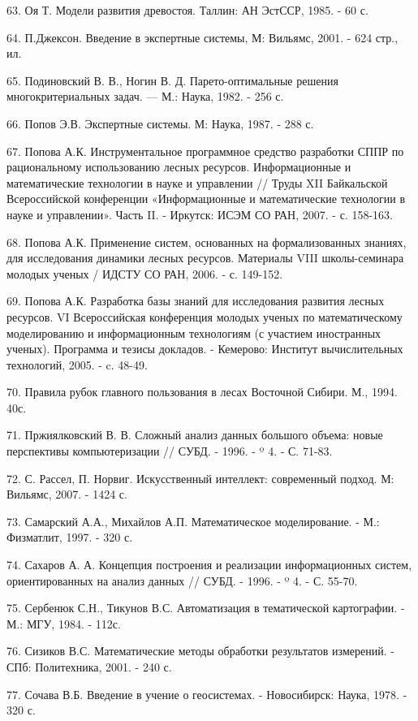 \documentclass{article}
\begin{document}
63. Оя Т. Модели развития древостоя. Таллин: АН 
ЭстССР, 1985. - 60 с.

64. П.Джексон. Введение в экспертные системы, 
М: Вильямс, 2001. - 624 стр., ил.

65. Подиновский В. В., Ногин В. Д. Парето-оптимальные 
решения многокритериальных задач. --- М.: Наука, 
1982. - 256 с.

66. Попов Э.В. Экспертные системы. М: Наука, 1987. 
- 288 с.

67. Попова А.К. Инструментальное программное 
средство разработки СППР по рациональному 
использованию лесных ресурсов. Информационные 
и математические технологии в науке и управлении 
// Труды XII Байкальской Всероссийской конференции 
«Информационные и математические технологии 
в науке и управлении». Часть II. - Иркутск: ИСЭМ 
СО РАН, 2007. - с. 158-163.

68. Попова А.К. Применение систем, основанных 
на формализованных знаниях, для исследования 
динамики лесных ресурсов. Материалы VIII школы-семинара 
молодых ученых / ИДСТУ СО РАН, 2006. - с. 149-152.

69. Попова А.К. Разработка базы знаний для исследования 
развития лесных ресурсов. VI Всероссийская конференция 
молодых ученых по математическому моделированию 
и информационным технологиям (с участием иностранных 
ученых). Программа и тезисы докладов. - Кемерово: 
Институт вычислительных технологий, 2005. - c. 
48-49.

70. Правила рубок главного пользования в лесах 
Восточной Сибири. М., 1994. 40с.

71. Пржиялковский В. В. Сложный анализ данных 
большого объема: новые перспективы компьютеризации 
// СУБД. - 1996. - º 4. - С. 71-83.

72. С. Рассел, П. Норвиг. Искусственный интеллект: 
современный подход. М: Вильямс, 2007. - 1424 с.\label{OLEHLINK22}\label{OLEHLINK23}

73. Самарский А.А., Михайлов А.П. Математическое 
моделирование. - М.: Физматлит, 1997. - 320 с.

74. Сахаров А. А. Концепция построения и реализации 
информационных систем, ориентированных на 
анализ данных // СУБД. - 1996. - º 4. - С. 55-70.

75. Сербенюк С.Н., Тикунов В.С. Автоматизация в 
тематической картографии. - М.: МГУ, 1984. - 112с.

76. Сизиков В.С. Математические методы обработки 
результатов измерений. - СПб: Политехника, 2001. 
- 240 с.

77. Сочава В.Б. Введение в учение о геосистемах. 
- Новосибирск: Наука, 1978. - 320 с.
\end{document}
